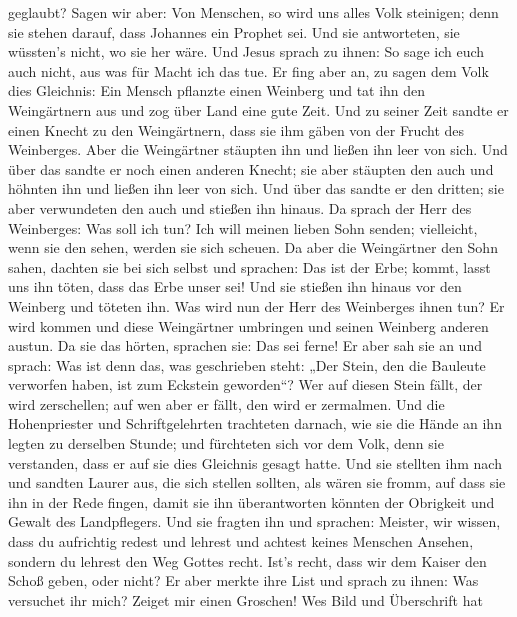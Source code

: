 geglaubt?  Sagen wir aber: Von Menschen, so wird uns alles
Volk steinigen; denn sie stehen darauf, dass Johannes ein Prophet sei.
 Und sie antworteten, sie wüssten's nicht, wo sie her wäre.
 Und Jesus sprach zu ihnen: So sage ich euch auch nicht, aus
was für Macht ich das tue.  Er fing aber an, zu sagen dem
Volk dies Gleichnis: Ein Mensch pflanzte einen Weinberg und tat ihn den
Weingärtnern aus und zog über Land eine gute Zeit.  Und zu
seiner Zeit sandte er einen Knecht zu den Weingärtnern, dass sie ihm
gäben von der Frucht des Weinberges. Aber die Weingärtner stäupten ihn
und ließen ihn leer von sich.  Und über das sandte er noch
einen anderen Knecht; sie aber stäupten den auch und höhnten ihn und
ließen ihn leer von sich.  Und über das sandte er den
dritten; sie aber verwundeten den auch und stießen ihn hinaus.
 Da sprach der Herr des Weinberges: Was soll ich tun? Ich
will meinen lieben Sohn senden; vielleicht, wenn sie den sehen, werden
sie sich scheuen.  Da aber die Weingärtner den Sohn sahen,
dachten sie bei sich selbst und sprachen: Das ist der Erbe; kommt, lasst
uns ihn töten, dass das Erbe unser sei!  Und sie stießen
ihn hinaus vor den Weinberg und töteten ihn. Was wird nun der Herr des
Weinberges ihnen tun?  Er wird kommen und diese Weingärtner
umbringen und seinen Weinberg anderen austun. Da sie das hörten,
sprachen sie: Das sei ferne!  Er aber sah sie an und
sprach: Was ist denn das, was geschrieben steht: „Der Stein, den die
Bauleute verworfen haben, ist zum Eckstein geworden``?  Wer
auf diesen Stein fällt, der wird zerschellen; auf wen aber er fällt, den
wird er zermalmen.  Und die Hohenpriester und
Schriftgelehrten trachteten darnach, wie sie die Hände an ihn legten zu
derselben Stunde; und fürchteten sich vor dem Volk, denn sie verstanden,
dass er auf sie dies Gleichnis gesagt hatte.  Und sie
stellten ihm nach und sandten Laurer aus, die sich stellen sollten, als
wären sie fromm, auf dass sie ihn in der Rede fingen, damit sie ihn
überantworten könnten der Obrigkeit und Gewalt des Landpflegers.
 Und sie fragten ihn und sprachen: Meister, wir wissen,
dass du aufrichtig redest und lehrest und achtest keines Menschen
Ansehen, sondern du lehrest den Weg Gottes recht.  Ist's
recht, dass wir dem Kaiser den Schoß geben, oder nicht?  Er
aber merkte ihre List und sprach zu ihnen: Was versuchet ihr mich?
 Zeiget mir einen Groschen! Wes Bild und Überschrift hat
